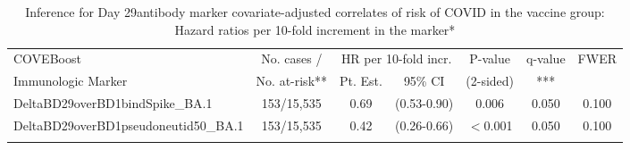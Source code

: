 \begin{longtable}{lcccccc}
\caption{Inference for Day 29antibody marker covariate-adjusted correlates of risk of COVID in the vaccine group: Hazard ratios per 10-fold increment in the marker*} \\ 
   \hline
 
         \multicolumn{1}{l}{COVEBoost} & \multicolumn{1}{c}{No. cases /}   & \multicolumn{2}{c}{HR per 10-fold incr.}                     & \multicolumn{1}{c}{P-value}   & \multicolumn{1}{c}{q-value}   & \multicolumn{1}{c}{FWER} \\ 
         \multicolumn{1}{l}{Immunologic Marker}            & \multicolumn{1}{c}{No. at-risk**} & \multicolumn{1}{c}{Pt. Est.} & \multicolumn{1}{c}{95\% CI} & \multicolumn{1}{c}{(2-sided)} & \multicolumn{1}{c}{***} & \multicolumn{1}{c}{} \\ 
         \hline
 
    DeltaBD29overBD1bindSpike\_BA.1 & 153/15,535 & 0.69 & (0.53-0.90) & 0.006 & 0.050 & 0.100 \\ 
  DeltaBD29overBD1pseudoneutid50\_BA.1 & 153/15,535 & 0.42 & (0.26-0.66) & $<$0.001 & 0.050 & 0.100 \\ 
   \hline
\hline
\label{tab:CoR_univariable_svycoxph_pretty}
\end{longtable}
